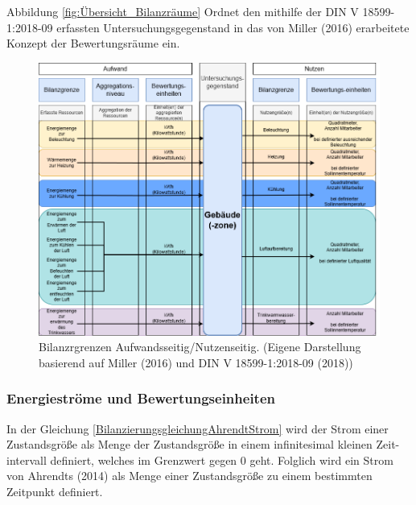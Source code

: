 Abbildung \eqref{fig:Übersicht_Bilanzräume} Ordnet den mithilfe der DIN V 18599-1:2018-09 erfassten Untersuchungsgegenstand in das von Miller (2016) erarbeitete Konzept der 
Bewertungsräume ein.

\begin{figure}[H]
    \centering
    \includegraphics[width=1\textwidth]{../../Ressourcen/Abbildungen/Nutzengröße_Bewertungseinheit.png}
    \caption{Bilanzrgrenzen Aufwandsseitig/Nutzenseitig. (Eigene Darstellung basierend auf Miller (2016) und DIN V 18599-1:2018-09 (2018))}
    \label{fig:Übersicht_Bilanzräume}
\end{figure}


\subsubsection{Energieströme und Bewertungseinheiten}
In der Gleichung \eqref{BilanzierungsgleichungAhrendtStrom} wird der Strom einer Zustandsgröße als Menge der Zustandsgröße in einem infinitesimal kleinen Zeit-
intervall definiert, welches im Grenzwert gegen 0 geht. Folglich wird ein Strom von Ahrendts (2014) als Menge einer Zustandsgröße zu einem bestimmten Zeitpunkt 
definiert. 

